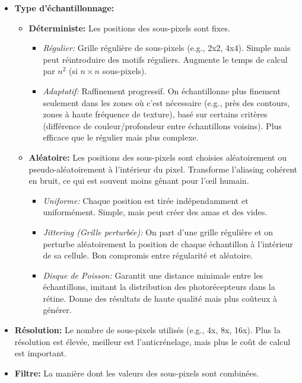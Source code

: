 \documentclass{article}
\begin{document}
\begin{itemize}
    \item \textbf{Type d'échantillonnage:}
        \begin{itemize}
            \item \textbf{Déterministe:} Les positions des sous-pixels sont fixes.
                \begin{itemize}
                    \item \textit{Régulier:} Grille régulière de sous-pixels (e.g., 2x2, 4x4). Simple mais peut réintroduire des motifs réguliers. Augmente le temps de calcul par $n^2$ (si $n \times n$ sous-pixels).
                    \item \textit{Adaptatif:} Raffinement progressif. On échantillonne plus finement seulement dans les zones où c'est nécessaire (e.g., près des contours, zones à haute fréquence de texture), basé sur certains critères (différence de couleur/profondeur entre échantillons voisins). Plus efficace que le régulier mais plus complexe.
                \end{itemize}
            \item \textbf{Aléatoire:} Les positions des sous-pixels sont choisies aléatoirement ou pseudo-aléatoirement à l'intérieur du pixel. Transforme l'aliasing cohérent en bruit, ce qui est souvent moins gênant pour l'œil humain.
                \begin{itemize}
                    \item \textit{Uniforme:} Chaque position est tirée indépendamment et uniformément. Simple, mais peut créer des amas et des vides.
                    \item \textit{Jittering (Grille perturbée):} On part d'une grille régulière et on perturbe aléatoirement la position de chaque échantillon à l'intérieur de sa cellule. Bon compromis entre régularité et aléatoire.
                    \item \textit{Disque de Poisson:} Garantit une distance minimale entre les échantillons, imitant la distribution des photorécepteurs dans la rétine. Donne des résultats de haute qualité mais plus coûteux à générer.
                \end{itemize}
        \end{itemize}
    \item \textbf{Résolution:} Le nombre de sous-pixels utilisés (e.g., 4x, 8x, 16x). Plus la résolution est élevée, meilleur est l'anticrénelage, mais plus le coût de calcul est important.
    \item \textbf{Filtre:} La manière dont les valeurs des sous-pixels sont combinées.

\end{itemize}
\end{document}
